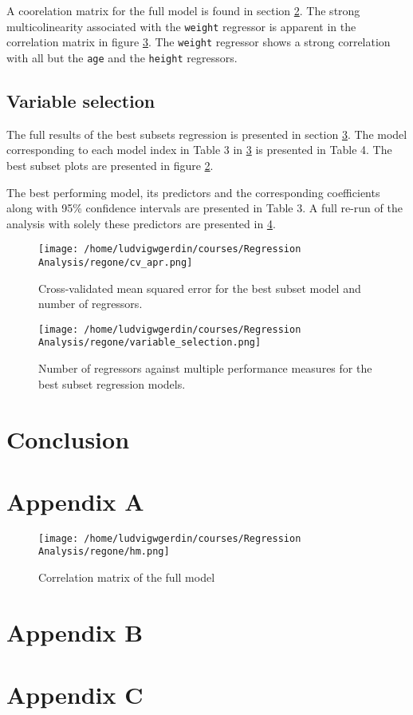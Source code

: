 \documentclass[11pt]{article}
\begin{document}
A coorelation matrix for the full model is found in section \ref{sec:orgf04bc93}. The strong multicolinearity
associated with the \texttt{weight} regressor is apparent in the correlation matrix in figure
\ref{fig:org373a376}. The \texttt{weight} regressor shows a strong correlation with all but the \texttt{age} and
the \texttt{height} regressors.

 

\subsection{Variable selection}
\label{sec:orgca41274}

The full results of the best subsets regression is presented in section \ref{sec:org976d071}. The model corresponding
to each model index in Table 3 in \ref{sec:org976d071} is presented in Table 4. The best subset plots 
are presented in figure \ref{fig:org9d67c50}.

The best performing model, its predictors and the corresponding coefficients along with 95\% confidence intervals 
are presented in Table 3. A full re-run of the analysis with solely these predictors are presented in \ref{sec:org1c53a16}.

\begin{figure}[htbp]
\centering
\texttt{[image: /home/ludvigwgerdin/courses/Regression Analysis/regone/cv\_apr.png]}
\caption{\label{fig:orgc1ce8b9}
Cross-validated mean squared error for the best subset model and number of regressors.}
\end{figure}

\begin{figure}[htbp]
\centering
\texttt{[image: /home/ludvigwgerdin/courses/Regression Analysis/regone/variable\_selection.png]}
\caption{\label{fig:org9d67c50}
Number of regressors against multiple performance measures for the best subset regression models.}
\end{figure}


\newpage
\section{Conclusion}
\label{sec:org7e4dd26}
\section{Appendix A}
\label{sec:orgf04bc93}
\begin{figure}[htbp]
\centering
\texttt{[image: /home/ludvigwgerdin/courses/Regression Analysis/regone/hm.png]}
\caption{\label{fig:org373a376}
Correlation matrix of the full model}
\end{figure}

\section{Appendix B}
\label{sec:org976d071}




\section{Appendix C}
\label{sec:org1c53a16}


\end{document}
